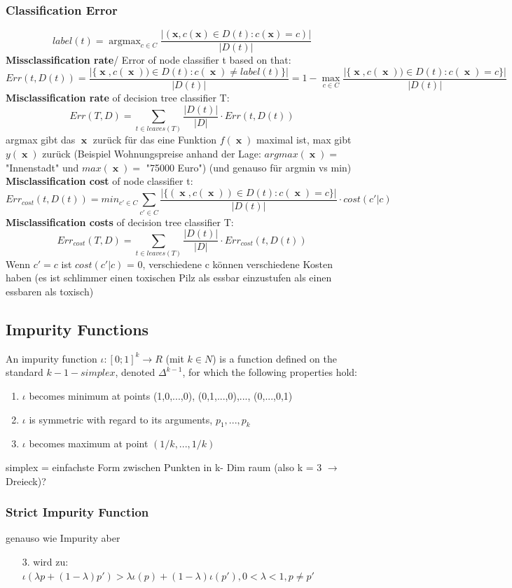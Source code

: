 \documentclass[11pt,a4paper]{article}
\DeclareMathOperator*{\argmax}{argmax}
\DeclareMathOperator*{\x}{\textbf{x}}
\begin{document}
\begin{flushleft}
\subsubsection{Classification Error}
$$ label(t) = \argmax_{c \in C} \dfrac{|(\textbf{x},c(\textbf{x}) \in D(t): c(\textbf{x}) = c)|}{|D(t)|} $$
\textbf{Missclassification rate}/ Error of node classifier t based on that:
$$ Err(t,D(t)) = \dfrac{|\{ \x , c( \x ) ) \in D (t) : c( \x ) \neq label(t) \} | }{|D(t)|} = 1 - \max_{c \in C} \dfrac{|\{ \x , c( \x ) ) \in D (t) : c( \x ) = c \} | }{|D(t)|} $$
\textbf{Misclassification rate} of decision tree classifier T: 
$$ Err(T,D) = \sum_{t \in leaves(T)} \frac{|D(t)|}{|D|} \cdot Err(t, D(t)) $$
argmax gibt das $\x $  zurück für das eine Funktion $f(\x )$ maximal ist, max gibt $ y (\x )$ zurück (Beispiel Wohnungspreise anhand der Lage: $argmax(\x ) =$  "Innenstadt" und $max(\x ) = $ "75000 Euro") (und genauso für argmin vs min) \\
\textbf{Misclassification cost} of node classifier t:
$$ Err_{cost}(t,D(t)) = min_{c' \in C} \sum_{c' \in C} \frac{|\{ (\x , c(\x )) \in D(t): c(\x )=c \}|}{|D(t)|} \cdot cost(c' | c) $$
\textbf{Misclassification costs} of decision tree classifier T:
$$ Err_{cost}(T,D) = \sum_{t \in leaves(T)} \frac{|D(t)|}{|D|} \cdot Err_{cost}(t, D(t)) $$
Wenn $c' = c$ ist $cost(c'|c)$ = 0, verschiedene c können verschiedene Kosten haben (es ist schlimmer einen toxischen Pilz als essbar einzustufen als einen essbaren als toxisch)

\subsection{Impurity Functions}
An impurity function $\iota : [0;1]^k \rightarrow R$ (mit $k \in N $) is a function defined on the standard
$k-1- simplex$, denoted $\Delta ^{k-1} $, for which the following properties hold:
\begin{enumerate}
\item $\iota $ becomes minimum at points (1,0,...,0), (0,1,...,0),..., (0,...,0,1)
\item $\iota $ is symmetric with regard to its arguments, $p_1, ... , p_k $
\item $\iota $ becomes maximum at point $(1/k, ..., 1/k)$
\end{enumerate}
simplex = einfachste Form zwischen Punkten in k- Dim raum (also k = 3 $\rightarrow$ Dreieck)? \\

\subsubsection{Strict Impurity Function} 
genauso wie Impurity aber 
\begin{itemize}
\item[3.] wird zu:  $ \iota(\lambda p + (1 - \lambda ) p' ) > \lambda \iota (p) + ( 1 - \lambda ) \iota (p'), 0 < \lambda < 1, p \neq p'  $
\end{itemize}


\end{flushleft}
\end{document}
